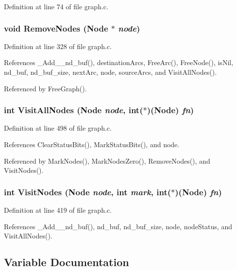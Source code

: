 Definition at line 74 of file graph.c.
\subsubsection{\setlength{\rightskip}{0pt plus 5cm}void Remove\-Nodes (\bf{Node} $\ast$ {\em node})}\label{graph_8c_d5015d73326f17e507235e0d42a998bf}




Definition at line 328 of file graph.c.

References \_\-Add\_\_\-nd\_\-buf(), destination\-Arcs, Free\-Arc(), Free\-Node(), is\-Nil, nd\_\-buf, nd\_\-buf\_\-size, next\-Arc, node, source\-Arcs, and Visit\-All\-Nodes().

Referenced by Free\-Graph().
\subsubsection{\setlength{\rightskip}{0pt plus 5cm}int Visit\-All\-Nodes (\bf{Node} {\em node}, int($\ast$)(\bf{Node}) {\em fn})}\label{graph_8c_2f317ea84f8bf39187eb9de4ae939a17}




Definition at line 498 of file graph.c.

References Clear\-Status\-Bits(), Mark\-Status\-Bits(), and node.

Referenced by Mark\-Nodes(), Mark\-Nodes\-Zero(), Remove\-Nodes(), and Visit\-Nodes().
\subsubsection{\setlength{\rightskip}{0pt plus 5cm}int Visit\-Nodes (\bf{Node} {\em node}, int {\em mark}, int($\ast$)(\bf{Node}) {\em fn})}\label{graph_8c_74de981dd26a9ce7580d9ef76a4aff04}




Definition at line 419 of file graph.c.

References \_\-Add\_\_\-nd\_\-buf(), nd\_\-buf, nd\_\-buf\_\-size, node, node\-Status, and Visit\-All\-Nodes().

\subsection{Variable Documentation}

